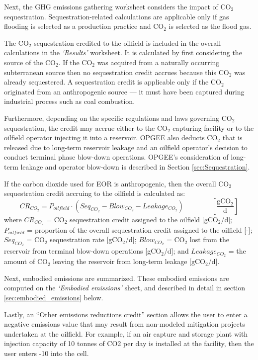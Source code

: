 \documentclass[11pt]{report}
\newcommand{\sheet}[1]{\textit{`{#1}'}}
\newcommand{\eqnunitfrac}[2]{\quad\quad \scriptstyle{\left[\frac{\text{#1}}{\text{#2}}\right]}}
\begin{document}
Next, the GHG emissions gathering worksheet considers the impact  of CO$_2$ sequestration. Sequestration-related calculations are applicable only if gas flooding is selected as a production practice and CO$_2$ is selected as the flood gas. 

The CO$_2$ sequestration credited to the oilfield is included in the overall calculations in the \sheet{Results} worksheet. It is calculated by first considering the source of the CO$_2$. If the CO$_2$ was acquired from a naturally occurring subterranean source then no sequestration credit accrues because this CO$_2$ was already sequestered. A sequestration credit is applicable only if the CO$_2$ originated from an anthropogenic source --- it must have been captured during industrial process such as coal combustion. 

Furthermore, depending on the specific regulations and laws governing CO$_2$ sequestration, the credit may accrue either to the CO$_2$ capturing facility or to the oilfield operator injecting it into a reservoir. OPGEE also deducts CO$_2$ that is released due to long-term reservoir leakage and an oilfield operator's decision to conduct terminal phase blow-down operations. OPGEE's consideration of long-term leakage and operator blow-down is described in Section \ref{sec:Sequestration}.

If the carbon dioxide used for EOR is anthropogenic, then the overall CO$_2$ sequestration credit accruing to the oilfield is calculated as:
\begin{equation} \label{eq:SequestrationCredit}
CR_{CO_{2}} = P_{oilfield} \cdot (Seq_{CO_{2}} - Blow_{CO_{2}} - Leakage_{CO_{2}}) \quad\quad\eqnunitfrac{gCO$_2$}{d}
\end{equation}
 where $CR_{CO_{2}}$ = CO$_2$ sequestration credit assigned to the oilfield [gCO$_2$/d]; $P_{oilfield}$ = proportion of the overall sequestration credit assigned to the oilfield [-]; $Seq_{CO_{2}}$ = CO$_2$ sequestration rate [gCO$_2$/d]; $Blow_{CO_{2}}$ = CO$_2$ lost from the reservoir from terminal blow-down operations [gCO$_2$/d]; and $Leakage_{CO_{2}}$ = the amount of CO$_2$ leaving the reservoir from long-term leakage [gCO$_2$/d].
 
Next, embodied emissions are summarized. These embodied emissions are computed on the \sheet{Embodied emissions} sheet, and described in detail in section \ref{sec:embodied_emissions} below.

Lastly, an ``Other emissions reductions credit'' section allows the user to enter a negative emissions value that may result from non-modeled mitigation projects undertaken at the oilfield. For example, if an air capture and storage plant with injection capacity of 10 tonnes of CO2 per day is installed at the facility, then the user enters -10 into the cell.
\end{document}

